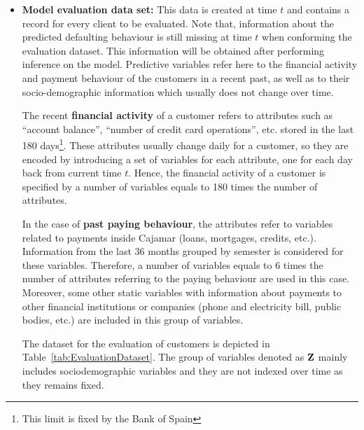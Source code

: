\begin{itemize}
\item \textbf{Model evaluation data set:} This data is created at time $t$ and contains a record for every client to be evaluated. Note that, information about the predicted defaulting behaviour is still missing at time $t$ when conforming the evaluation dataset. This information will be obtained after performing inference on the model. 
Predictive variables refer here to the financial activity and payment behaviour of the customers in a recent past, as well as to their socio-demographic information which usually does not change over time.

The recent {\bf financial activity} of a customer refers to attributes such as ``account balance'', ``number of credit card operations'', etc. stored in the last 180 days\footnote{This limit is fixed by the Bank of Spain}. These attributes usually change daily for a customer, so they are encoded by introducing a set of variables for each attribute, one for each day back from current time $t$. Hence, the financial activity of a customer is specified by a number of variables equals to 180 times the number of attributes. 

In the case of {\bf past paying behaviour}, the attributes refer to variables related to payments inside Cajamar (loans, mortgages, credits, etc.). Information from the last 36 months grouped by semester is considered for these variables. Therefore, a number of variables equals to $6$ times the number of attributes referring to the paying behaviour are used in this case. Moreover, some other static variables with information about payments to other financial institutions or companies (phone and electricity bill, public bodies, etc.) are included in this group of variables.

The dataset for the evaluation of customers is depicted in Table~\ref{tab:EvaluationDataset}. The group of variables denoted as $\mathbf{Z}$ mainly includes sociodemographic variables and they are not indexed over time as they remains fixed.  


\end{itemize}
